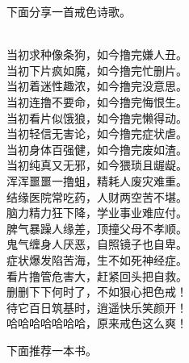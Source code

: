 下面分享一首戒色诗歌。

\begin{poem}[戒色诗]
    \begin{multicols}{2}
        \begin{center}~\\
            当初求种像条狗，如今撸完嫌人丑。 \\ 当初下片疯如魔，如今撸完忙删片。 \\ 当初着迷性趣浓，如今撸完没意思。 \\ 当初连撸不要命，如今撸完悔恨生。 \\ 当初看片似饿狼，如今撸完懒得动。 \\ 当初轻信无害论，如今撸完症状虐。 \\ 当初身体百强健，如今撸完废如渣。 \\ 当初纯真又无邪，如今猥琐且龌龊。 \\ 浑浑噩噩一撸蛆，精耗人废灾难重。 \\ 结缘医院常吃药，人财两空苦不堪。 \\ 脑力精力狂下降，学业事业难应付。 \\ 脾气暴躁人缘差，顶撞父母不孝顺。 \\ 鬼气缠身人厌恶，自照镜子也自卑。 \\ 症状爆发陷苦海，生不如死神经症。 \\ 看片撸管危害大，赶紧回头把自救。 \\ 删删下下何时了，不如狠心把色戒！ \\ 待它百日筑基时，逍遥快乐笑颜开！ \\ 哈哈哈哈哈哈哈，原来戒色这么爽！
        \end{center}
    \end{multicols}
\end{poem}

下面推荐一本书。

